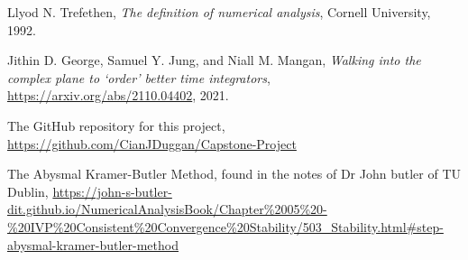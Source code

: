 \providecommand{\bysame}{\leavevmode\hbox to3em{\hrulefill}\thinspace}
\providecommand{\href}[2]{#2}
\begin{thebibliography}{1}

Llyod N. Trefethen, \emph{{T}he definition of numerical analysis}, Cornell University, 1992.

Jithin D. George, Samuel Y. Jung, and Niall M. Mangan, \emph{{W}alking into the complex plane to `order' better time integrators}, \url{https://arxiv.org/abs/2110.04402}, 2021.

The GitHub repository for this project, \url{https://github.com/CianJDuggan/Capstone-Project}

The Abysmal Kramer-Butler Method, found in the notes of Dr John butler of TU Dublin, \url{https://john-s-butler-dit.github.io/NumericalAnalysisBook/Chapter\%2005\%20-\%20IVP\%20Consistent\%20Convergence\%20Stability/503_Stability.html#step-abysmal-kramer-butler-method}
\end{thebibliography}
